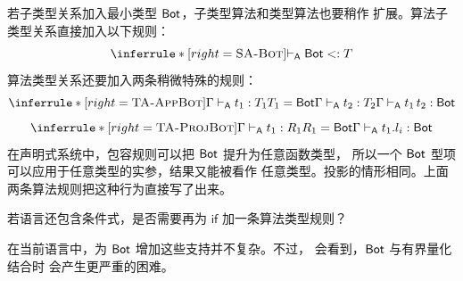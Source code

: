 若子类型关系加入最小类型 \(\mathsf{Bot}\)，子类型算法和类型算法也要稍作
扩展。算法子类型关系直接加入以下规则：
\[
\inferrule*[right=\textsc{SA-Bot}]
 { }{\algturnstile\tapltype{Bot}\subtype T}
\]
算法类型关系还要加入两条稍微特殊的规则：
\[
\inferrule*[right=\textsc{TA-AppBot}]
 {\Gamma\algturnstile t_1:T_1\\T_1=\tapltype{Bot}\\
  \Gamma\algturnstile t_2:T_2}
 {\Gamma\algturnstile t_1\,t_2:\tapltype{Bot}}
\]
\[
\inferrule*[right=\textsc{TA-ProjBot}]
 {\Gamma\algturnstile t_1:R_1\\R_1=\tapltype{Bot}}
 {\Gamma\algturnstile t_1.l_i:\tapltype{Bot}}
\]
在声明式系统中，包容规则可以把 \(\mathsf{Bot}\) 提升为任意函数类型，
所以一个 \(\mathsf{Bot}\) 型项可以应用于任意类型的实参，结果又能被看作
任意类型。投影的情形相同。上面两条算法规则把这种行为直接写了出来。

\begin{exercise}[\(\star\)]
\label{ex:16.4.1}
若语言还包含条件式，是否需要再为 \(\mathsf{if}\) 加一条算法类型规则？
\end{exercise}

在当前语言中，为 \(\mathsf{Bot}\) 增加这些支持并不复杂。不过，
会看到，\(\mathsf{Bot}\) 与有界量化结合时
会产生更严重的困难。
